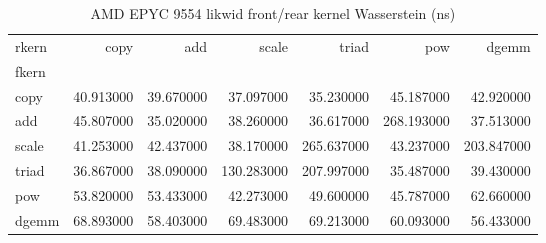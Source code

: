 \begin{table}
\caption{AMD EPYC 9554 likwid front/rear kernel Wasserstein (ns)}
\begin{tabular}{lrrrrrr}
\toprule
rkern & copy & add & scale & triad & pow & dgemm \\
fkern &  &  &  &  &  &  \\
\midrule
copy & 40.913000 & 39.670000 & 37.097000 & 35.230000 & 45.187000 & 42.920000 \\
add & 45.807000 & 35.020000 & 38.260000 & 36.617000 & 268.193000 & 37.513000 \\
scale & 41.253000 & 42.437000 & 38.170000 & 265.637000 & 43.237000 & 203.847000 \\
triad & 36.867000 & 38.090000 & 130.283000 & 207.997000 & 35.487000 & 39.430000 \\
pow & 53.820000 & 53.433000 & 42.273000 & 49.600000 & 45.787000 & 62.660000 \\
dgemm & 68.893000 & 58.403000 & 69.483000 & 69.213000 & 60.093000 & 56.433000 \\
\bottomrule
\end{tabular}
\end{table}
